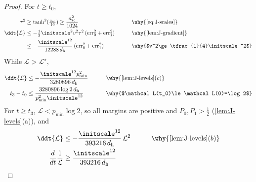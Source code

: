 \begin{proof}
For $t\ge t_0$,
\begin{alignat*}{2}
 \tau^2&\ge\tanh^2(\tfrac{a_{\mathrm{sc}}}{16})\ge\frac{a_{\mathrm{sc}}^2}{1024} &\qquad& \why{\cref{eq:J-scales}}\\
 \ddt{\mathcal L}&\le-\tfrac{1}{3}\initscale^2v^2\tau^2\,(\mathrm{err}_0^2+\mathrm{err}_1^2) && \why{\cref{lem:J-gradient}}\\
 &\le-\frac{\initscale^{12}}{12288\,d_{\mathrm h}}\,(\mathrm{err}_0^2+\mathrm{err}_1^2) && \why{$v^2\ge\tfrac{1}{4}\initscale^2$}
\end{alignat*}
While $\mathcal L>\mathcal L^\star$,
\begin{alignat*}{2}
 \ddt{\mathcal L}&\le-\frac{\initscale^{12}p_{\min}^2}{3280896\,d_{\mathrm h}} &\qquad& \why{\cref{lem:J-levels}(c)}\\
 t_3-t_0&\le\frac{3280896\log 2\,d_{\mathrm h}}{p_{\min}^2\initscale^{12}} && \why{$\mathcal L(t_0)\le\mathcal L(0)=\log 2$}
\end{alignat*}
For $t\ge t_3$, $\mathcal L<p_{\min}\log2$, so all margins are positive and $P_0,P_1>\frac{1}{2}$ (\cref{lem:J-levels}(a)), and
\begin{alignat*}{2}
 \ddt{\mathcal L}&\le-\frac{\initscale^{12}}{393216\,d_{\mathrm h}}\,\mathcal L^2 &\qquad& \why{\cref{lem:J-levels}(b)}\\
 \frac{d}{dt}\frac{1}{\mathcal L}&\ge\frac{\initscale^{12}}{393216\,d_{\mathrm h}} && \qedhere
\end{alignat*}
\end{proof}

